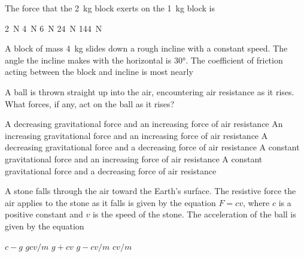 \documentclass{../../../oss-apphys-exam}
\begin{document}
\begin{multicols*}{2}
\begin{questions}
    \question The force that the \SI{2}{\kilo\gram} block exerts on the
    \SI{1}{\kilo\gram} block is
    \begin{choices}
      \choice\SI{2}{\newton}
      \choice\SI{4}{\newton}
      \choice\SI{6}{\newton}
      \choice\SI{24}{\newton}
      \choice\SI{144}{\newton}
    \end{choices}
    \label{3blks2}

    \question A block of mass \SI{4}{\kilo\gram} slides down a rough incline
    with a constant speed. The angle the incline makes with the horizontal is
    \ang{30}. The coefficient of friction acting between the block and incline
    is most nearly
    \begin{center}
    \end{center}
    \begin{choices}
    \end{choices}

    \question A ball is thrown straight up into the air, encountering air
    resistance as it rises. What forces, if any, act on the ball as it rises?
    \begin{choices}
      \choice A decreasing gravitational force and an increasing force of air
      resistance
      \choice An increasing gravitational force and an increasing force of air
      resistance
      \choice A decreasing gravitational force and a decreasing force of air
      resistance
      \choice A constant gravitational force and an increasing force of air
      resistance
      \choice A constant gravitational force and a decreasing force of air
      resistance
    \end{choices}

    \question A stone falls through the air toward the Earth's surface. The
    resistive force the air applies to the stone as it falls is given by the
    equation $F=cv$, where $c$ is a positive constant and $v$ is the speed of
    the stone. The acceleration of the ball is given by the equation
    \begin{choices}
      \choice $c-g$
      \choice $gcv/m$
      \choice $g+cv$
      \choice $g-cv/m$
      \choice $cv/m$
    \end{choices}
    

\end{questions}
\end{multicols*}
\end{document}
